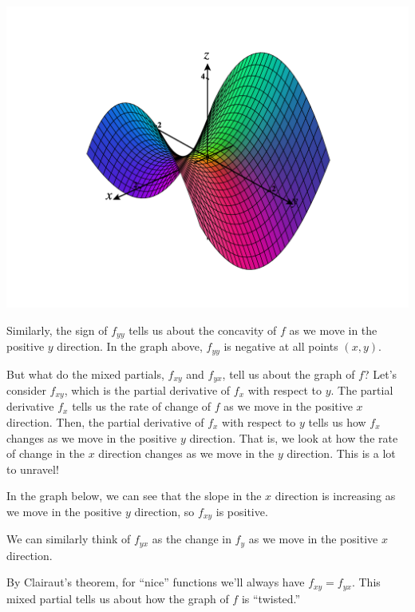 \documentclass{ximera}
\begin{document}
\begin{image}
\includegraphics[width = \textwidth]{CalcPlot3D-fxx_pos}
\end{image}

Similarly, the sign of $f_{yy}$ tells us about the concavity of $f$ as we move in the positive $y$ direction. In the graph above, $f_{yy}$ is negative at all points $(x,y)$.

But what do the mixed partials, $f_{xy}$ and $f_{yx}$, tell us about the graph of $f$? Let's consider $f_{xy}$, which is the partial derivative of $f_x$ with respect to $y$. The partial derivative $f_x$ tells us the rate of change of $f$ as we move in the positive $x$ direction. Then, the partial derivative of $f_x$ with respect to $y$ tells us how $f_x$ changes as we move in the positive $y$ direction. That is, we look at how the rate of change in the $x$ direction changes as we move in the $y$ direction. This is a lot to unravel!

In the graph below, we can see that the slope in the $x$ direction is increasing as we move in the positive $y$ direction, so $f_{xy}$ is positive.


We can similarly think of $f_{yx}$ as the change in $f_y$ as we move in the positive $x$ direction.


By Clairaut's theorem, for ``nice'' functions we'll always have $f_{xy}=f_{yx}$. This mixed partial tells us about how the graph of $f$ is ``twisted.''
\end{document}
